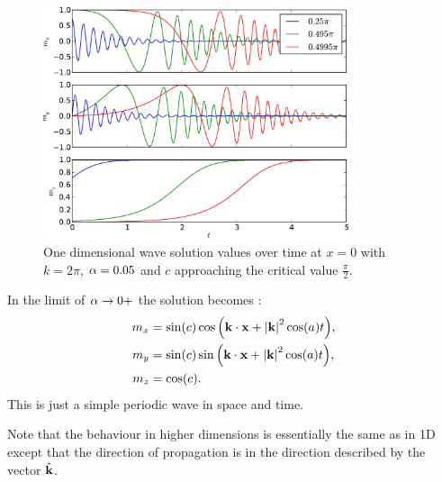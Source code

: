 \begin{figure}
  \centering
  \includegraphics[width=0.8\textwidth]{plots/wave_exact_solution_parameters/exact_solution_parameters_complex.pdf}
  \caption{One dimensional wave solution values over time at $x=0$ with $k = 2\pi$, $\alpha = 0.05$ and $c$ approaching the critical value $\frac{\pi}{2}$.}
  \label{fig:wave-solution-vary-c-complex}
\end{figure}


In the limit of $\alpha \rightarrow 0+$ the solution becomes \cite{Fuwa2006}:
\begin{equation}
  \begin{aligned}
    m_x &= \sin(c) \cos{\left( \boldsymbol{\mathrm{k}}\cdot \boldsymbol{\mathrm{x}}+ \left|{\boldsymbol{\mathrm{k}}} \right|^2 \cos(a) t \right)}, \\
    m_y &= \sin(c) \sin{\left( \boldsymbol{\mathrm{k}}\cdot \boldsymbol{\mathrm{x}}+ \left|{\boldsymbol{\mathrm{k}}} \right|^2 \cos(a) t \right)}, \\
    m_z &= \cos(c).
  \end{aligned}
\end{equation}
This is just a simple periodic wave in space and time.

Note that the behaviour in higher dimensions is essentially the same as in 1D except that the direction of propagation is in the direction described by the vector ${\hat{\mathbf{k}}}$.





